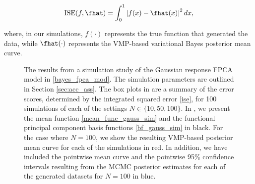 \documentclass[12pt]{article}
\theoremstyle{plain}
\theoremstyle{definition}
\theoremstyle{remark}
\begin{document}
\begin{equation}
	\text{ISE} (f, \fhat) = \int_0^1 \left| f (x) - \fhat(x) \right|^2 dx,
\label{ise}
\end{equation}

\noindent where, in our simulations, $f (\cdot)$ represents the true function that generated the data, while $\fhat (\cdot)$
represents the VMP-based variational Bayes posterior mean curve.

\begin{figure}[t!]
\centering
\tabskip=0pt
\caption{
	The results from a simulation study of the Gaussian response FPCA model in \eqref{bayes_fpca_mod}. The
	simulation parameters are outlined in Section \ref{sec:acc_ass}.
	The box plots in  are a summary of the error scores, determined by the integrated
	squared error \eqref{ise}, for 100 simulations of each of the settings $N \in \{ 10, 50, 100 \}$.
	In , we present the mean function \eqref{mean_func_gauss_sim} and the functional
	principal component basis functions \eqref{bf_gauss_sim} in black. For the case where $N = 100$, we show
	the resulting VMP-based posterior mean curve for each of the simulations in red. In addition, we have
	included the pointwise mean curve and the pointwise 95\% confidence intervals resulting from the MCMC
	posterior estimates for each of the generated datasets
	for $N = 100$ in blue.
}
\label{fig:gauss_resp_sim_st}
\end{figure}
\end{document}
